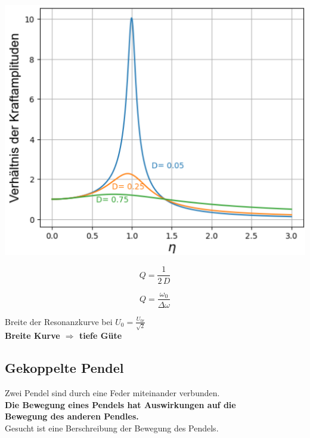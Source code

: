 \begin{minipage}{0.4\linewidth}
\includegraphics[width=0.95\linewidth]{Bilder/Wellen-Optik/guete_resonanz} 
\end{minipage}
\hfill
\begin{minipage}{0.58\linewidth}

\begin{minipage}{0.48\linewidth}
$$ \boxed{Q = \frac{1}{2 \, D} } $$ 
\end{minipage}
\hfill
\begin{minipage}{0.48\linewidth}
$$ \boxed{ Q = \frac{\omega_0}{\Delta \omega} } $$
\end{minipage}

\vspace{0.2cm}

Breite der Resonanzkurve bei $U_0 = \frac{U_{0r}}{\sqrt{2}}$ \\


\textbf{Breite Kurve $\Rightarrow$ tiefe Güte}
\end{minipage}



\subsection{Gekoppelte Pendel}
Zwei Pendel sind durch eine Feder miteinander verbunden. \\
\textbf{Die Bewegung eines Pendels hat Auswirkungen auf die \\
Bewegung des anderen Pendles.} \\
Gesucht ist eine Berschreibung der Bewegung des Pendels. \\

